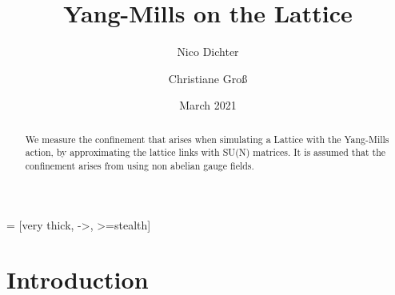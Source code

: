\documentclass[%
 reprint,
 amsmath,amssymb,
 aps,
]{revtex4-1}
\begin{document}
	 = [very thick, ->, >=stealth]

\title{Yang-Mills on the Lattice}%

\author{Nico Dichter}
\author{Christiane Gro\ss{}}


\date{March 2021}%

\begin{abstract}
	We measure the confinement that arises when simulating a Lattice with the Yang-Mills action, by approximating the lattice links with SU(N) matrices. It is assumed that the confinement arises from using non abelian gauge fields.
\end{abstract}
\maketitle


\section{Introduction}
%

\end{document}
